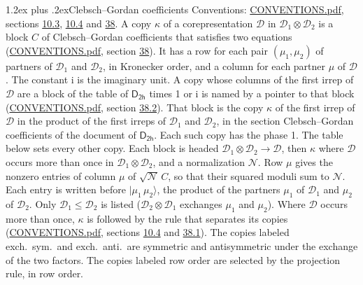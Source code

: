 \documentclass[10pt,a4paper]{article}
\makeatletter
\renewcommand\section{\@startsection{section}{1}{\z@}{-3ex plus -1ex minus -.2ex}%
  {1.2ex plus .2ex}{\normalfont\large\sffamily\bfseries\color{parttitle}}}
\numberwithin{equation}{section}
\newcommand{\grp}[1]{\mathsf{#1}}
\newcommand{\iunit}{\mathrm{i}}
\newcommand{\irrprod}{\otimes}
\newcommand{\mult}{\kappa}
\newcommand{\intx}{\mu}
\newcommand{\cgnorm}{\mathcal{N}}
\newcommand{\prodket}[2]{\lvert {#1}\,{#2}\rangle}
\makeatother
\begin{document}
\section{Clebsch--Gordan coefficients}\label{s:clebsch_gordan}
Conventions: \href{../../CONVENTIONS.pdf}{CONVENTIONS.pdf}, sections \href{../../../rotation/CONVENTIONS.pdf\#conv.10.3}{10.3}, \href{../../../rotation/CONVENTIONS.pdf\#conv.10.4}{10.4} and \href{../../CONVENTIONS.pdf\#conv.38}{38}.
\leavevmode\label{n:index.copy}\label{n:matrix.cg.stored}A copy $\mult$ of a corepresentation $\mathcal{D}$ in $\mathcal{D}_1\irrprod\mathcal{D}_2$ is a block $C$ of Clebsch--Gordan coefficients that satisfies two equations (\href{../../CONVENTIONS.pdf}{CONVENTIONS.pdf}, section \href{../../CONVENTIONS.pdf\#conv.38}{38}). \label{n:index.cg}It has a row for each pair $(\intx_1, \intx_2)$ of partners of $\mathcal{D}_1$ and $\mathcal{D}_2$, in Kronecker order, and a column for each partner $\intx$ of $\mathcal{D}$.
The constant $\iunit$ is the imaginary unit.
A copy whose columns of the first irrep of $\mathcal{D}$ are a block of the table of $\grp{D_{2h}}$ times 1 or $\iunit$ is named by a pointer to that block (\href{../../CONVENTIONS.pdf}{CONVENTIONS.pdf}, section \href{../../CONVENTIONS.pdf\#conv.38.2}{38.2}). That block is the copy $\mult$ of the first irrep of $\mathcal{D}$ in the product of the first irreps of $\mathcal{D}_1$ and $\mathcal{D}_2$, in the section Clebsch--Gordan coefficients of the document of \href{../../../rotation/data/pdf/D2h.pdf}{$\grp{D_{2h}}$}. Each such copy has the phase 1. The table below sets every other copy.
Each block is headed $\mathcal{D}_1\irrprod\mathcal{D}_2\to\mathcal{D}$, then $\mult$ where $\mathcal{D}$ occurs more than once in $\mathcal{D}_1\irrprod\mathcal{D}_2$, and a normalization $\cgnorm$. Row $\intx$ gives the nonzero entries of column $\intx$ of $\sqrt{\cgnorm}\,C$, so that their squared moduli sum to $\cgnorm$. \label{n:vector.ket.product}Each entry is written before $\prodket{\intx_1}{\intx_2}$, the product of the partners $\intx_1$ of $\mathcal{D}_1$ and $\intx_2$ of $\mathcal{D}_2$. Only $\mathcal{D}_1 \le \mathcal{D}_2$ is listed ($\mathcal{D}_2\irrprod\mathcal{D}_1$ exchanges $\intx_1$ and $\intx_2$).
Where $\mathcal{D}$ occurs more than once, $\mult$ is followed by the rule that separates its copies (\href{../../CONVENTIONS.pdf}{CONVENTIONS.pdf}, sections \href{../../../rotation/CONVENTIONS.pdf\#conv.10.4}{10.4} and \href{../../CONVENTIONS.pdf\#conv.38.1}{38.1}). \label{n:abbreviation.exchange}The copies labeled exch.\ sym.\ and exch.\ anti.\ are symmetric and antisymmetric under the exchange of the two factors. The copies labeled row order are selected by the projection rule, in row order.
\end{document}
